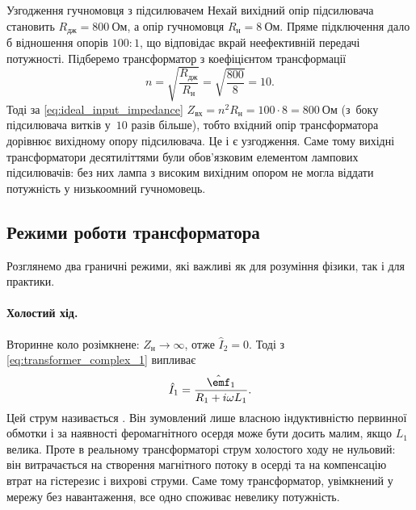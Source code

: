 \begin{Example}{Узгодження гучномовця з підсилювачем}
	Нехай вихідний опір підсилювача становить
	$R_{\text{дж}}=800\ \text{Ом}$, а опір гучномовця
	$R_{\text{н}}=8\ \text{Ом}$. Пряме підключення дало б
	відношення опорів $100:1$, що відповідає вкрай
	неефективній передачі потужності. Підберемо
	трансформатор з коефіцієнтом трансформації
	\[
		n = \sqrt{\frac{R_{\text{дж}}}{R_{\text{н}}}} = \sqrt{\frac{800}{8}} = 10.
	\]
	Тоді за \eqref{eq:ideal_input_impedance}
	$Z_{\text{вх}}=n^2R_{\text{н}} = 100\cdot8=800\ \text{Ом}$ (з~боку підсилювача витків у~$10$ разів більше),
	тобто вхідний опір трансформатора дорівнює вихідному опору
	підсилювача. Це і є узгодження. Саме тому вихідні
	трансформатори десятиліттями були обов'язковим елементом
	лампових підсилювачів: без них лампа з високим вихідним
	опором не могла віддати потужність у низькоомний
	гучномовець.
\end{Example}

\subsection*{Режими роботи трансформатора}

Розглянемо два граничні режими, які важливі як для розуміння
фізики, так і для практики.

\paragraph*{Холостий хід.} Вторинне коло розімкнене:
$Z_{\text{н}}\to\infty$, отже $\hat{I}_2=0$. Тоді з
\eqref{eq:transformer_complex_1} випливає
\begin{equation}\label{eq:no_load_current}
	\hat{I}_1 = \frac{\hat{\emf}_1}{R_1 + i\omega L_1}.
\end{equation}
Цей струм називається . Він
зумовлений лише власною індуктивністю первинної обмотки і за
наявності феромагнітного осердя може бути досить малим, якщо
$L_1$ велика. Проте в реальному трансформаторі струм холостого
ходу не нульовий: він витрачається на створення магнітного
потоку в осерді та на компенсацію втрат на гістерезис і вихрові
струми. Саме тому трансформатор, увімкнений у мережу без
навантаження, все одно споживає невелику потужність.


